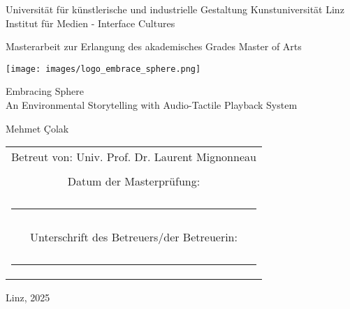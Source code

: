 \begin{titlepage}
    \centering

    {\large
    Universität für künstlerische und industrielle Gestaltung Kunstuniversität Linz\\
    Institut für Medien - Interface Cultures}
    
    \vspace{0.2cm}

    {\large Masterarbeit zur Erlangung des akademisches Grades Master of Arts\\}

    \vspace{0.5cm}

    \texttt{[image: images/logo\_embrace\_sphere.png]}
    
    {\Huge Embracing Sphere\\[0.5cm]
    \Large An Environmental Storytelling with Audio-Tactile Playback System}

    \vspace{0.5cm}

    {\LARGE Mehmet Çolak}

    \vfill

    \begin{tabular}{c}
        \Large Betreut von: Univ. Prof. Dr. Laurent Mignonneau \\ \\
        \large Datum der Masterprüfung: \\ \\
        \rule{3cm}{0.1pt} \\ \\
        \large Unterschrift des Betreuers/der Betreuerin: \\ \\
        \rule{3cm}{0.1pt} \\
    \end{tabular}
    
    \vspace{1cm}
    
    {\small Linz, 2025}

\end{titlepage}
